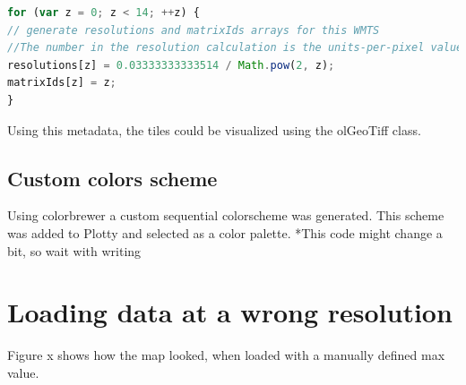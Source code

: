 \begin{lstlisting}[language=JavaScript, caption={The JavaScript in the project}, label= VoresJS,escapechar=|]
for (var z = 0; z < 14; ++z) {
// generate resolutions and matrixIds arrays for this WMTS
//The number in the resolution calculation is the units-per-pixel value at zoomlayer 0 in the xml file generated by gdal2tiles
resolutions[z] = 0.03333333333514 / Math.pow(2, z);
matrixIds[z] = z;
}
\end{lstlisting}
Using this metadata, the tiles could be visualized using the olGeoTiff class. 



\subsection{Custom colors scheme}
Using colorbrewer a custom sequential colorscheme was generated. This scheme was added to Plotty and selected as a color palette.
*This code might change a bit, so wait with writing  


\section{Loading data at a wrong resolution}\label{PresentingBug}
Figure x shows how the map looked, when loaded with a manually defined max value.


